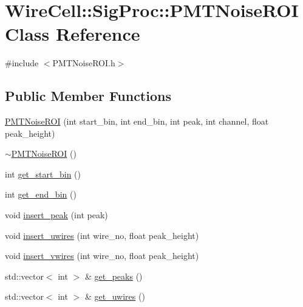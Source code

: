 \hypertarget{class_wire_cell_1_1_sig_proc_1_1_p_m_t_noise_r_o_i}{}\section{Wire\+Cell\+:\+:Sig\+Proc\+:\+:P\+M\+T\+Noise\+R\+OI Class Reference}
\label{class_wire_cell_1_1_sig_proc_1_1_p_m_t_noise_r_o_i}


{\ttfamily \#include $<$P\+M\+T\+Noise\+R\+O\+I.\+h$>$}

\subsection*{Public Member Functions}
\begin{DoxyCompactItemize}
\item 
\hyperlink{class_wire_cell_1_1_sig_proc_1_1_p_m_t_noise_r_o_i_a86b042170d45fcc2da43e249f266782a}{P\+M\+T\+Noise\+R\+OI} (int start\+\_\+bin, int end\+\_\+bin, int peak, int channel, float peak\+\_\+height)
\item 
\hyperlink{class_wire_cell_1_1_sig_proc_1_1_p_m_t_noise_r_o_i_ae6cc0bab207dcb5653efa9f023ad0cdc}{$\sim$\+P\+M\+T\+Noise\+R\+OI} ()
\item 
int \hyperlink{class_wire_cell_1_1_sig_proc_1_1_p_m_t_noise_r_o_i_a4122e466578dee161bee0219bceec33e}{get\+\_\+start\+\_\+bin} ()
\item 
int \hyperlink{class_wire_cell_1_1_sig_proc_1_1_p_m_t_noise_r_o_i_a33db997dd906db5cb63ba630e9d0f882}{get\+\_\+end\+\_\+bin} ()
\item 
void \hyperlink{class_wire_cell_1_1_sig_proc_1_1_p_m_t_noise_r_o_i_ab7da8d38dd37b3f81e064a9970e581f8}{insert\+\_\+peak} (int peak)
\item 
void \hyperlink{class_wire_cell_1_1_sig_proc_1_1_p_m_t_noise_r_o_i_a97674ed5490b45c6e8e72292ee4012e7}{insert\+\_\+uwires} (int wire\+\_\+no, float peak\+\_\+height)
\item 
void \hyperlink{class_wire_cell_1_1_sig_proc_1_1_p_m_t_noise_r_o_i_a117ae1e99cce01f1c72a55905f7fcf7e}{insert\+\_\+vwires} (int wire\+\_\+no, float peak\+\_\+height)
\item 
std\+::vector$<$ int $>$ \& \hyperlink{class_wire_cell_1_1_sig_proc_1_1_p_m_t_noise_r_o_i_a55cdf5dad6e7476bbb73226876feb55f}{get\+\_\+peaks} ()
\item 
std\+::vector$<$ int $>$ \& \hyperlink{class_wire_cell_1_1_sig_proc_1_1_p_m_t_noise_r_o_i_a56d725f413f496bd67f8cc8917fd5f2c}{get\+\_\+uwires} ()

\end{DoxyCompactItemize}
